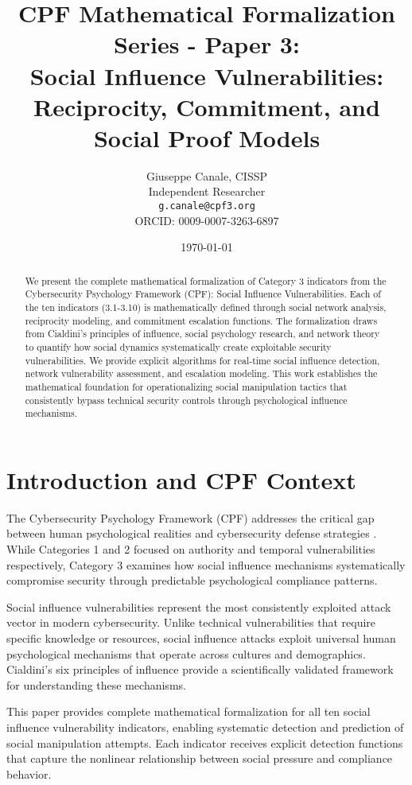 \documentclass[11pt,a4paper]{article}
\title{CPF Mathematical Formalization Series - Paper 3:\\Social Influence Vulnerabilities: Reciprocity, Commitment, and Social Proof Models}
\author{
    Giuseppe Canale, CISSP\\
    Independent Researcher\\
    \texttt{g.canale@cpf3.org}\\
    ORCID: 0009-0007-3263-6897
}
\date{\today}
\begin{document}
\maketitle

\begin{abstract}
We present the complete mathematical formalization of Category 3 indicators from the Cybersecurity Psychology Framework (CPF): Social Influence Vulnerabilities. Each of the ten indicators (3.1-3.10) is mathematically defined through social network analysis, reciprocity modeling, and commitment escalation functions. The formalization draws from Cialdini's principles of influence, social psychology research, and network theory to quantify how social dynamics systematically create exploitable security vulnerabilities. We provide explicit algorithms for real-time social influence detection, network vulnerability assessment, and escalation modeling. This work establishes the mathematical foundation for operationalizing social manipulation tactics that consistently bypass technical security controls through psychological influence mechanisms.
\end{abstract}

\section{Introduction and CPF Context}

The Cybersecurity Psychology Framework (CPF) addresses the critical gap between human psychological realities and cybersecurity defense strategies \cite{canale2024cpf}. While Categories 1 and 2 focused on authority and temporal vulnerabilities respectively, Category 3 examines how social influence mechanisms systematically compromise security through predictable psychological compliance patterns.

Social influence vulnerabilities represent the most consistently exploited attack vector in modern cybersecurity. Unlike technical vulnerabilities that require specific knowledge or resources, social influence attacks exploit universal human psychological mechanisms that operate across cultures and demographics. Cialdini's six principles of influence \cite{cialdini2007} provide a scientifically validated framework for understanding these mechanisms.

This paper provides complete mathematical formalization for all ten social influence vulnerability indicators, enabling systematic detection and prediction of social manipulation attempts. Each indicator receives explicit detection functions that capture the nonlinear relationship between social pressure and compliance behavior.
\end{document}
